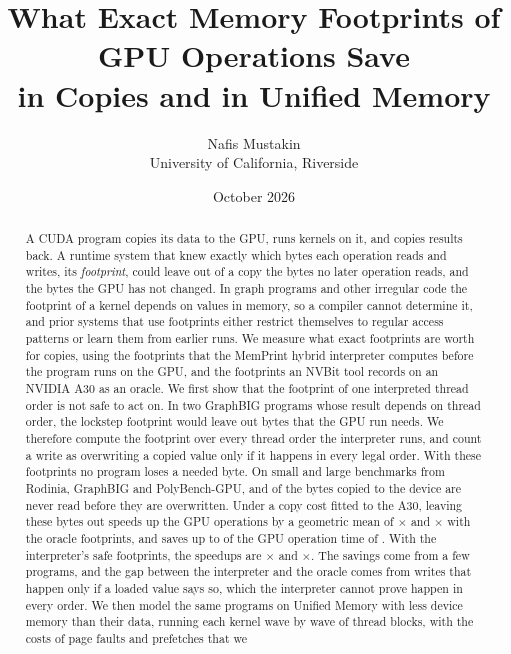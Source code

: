 \documentclass[11pt]{article}
\title{What Exact Memory Footprints of GPU Operations Save\\in Copies and in Unified Memory}
\author{Nafis Mustakin\\University of California, Riverside}
\date{October 2026}
\newcommand{\memprint}{MemPrint}
\newcommand{\term}[1]{\emph{#1}}
\newcommand{\code}[1]{\texttt{#1}}
\begin{document}
\maketitle



\begin{abstract}
A CUDA program copies its data to the GPU, runs kernels on it, and copies results back. A runtime system that
knew exactly which bytes each operation reads and writes, its \term{footprint}, could leave out of a copy the bytes
no later operation reads, and the bytes the GPU has not changed. In graph programs and other irregular code the
footprint of a kernel depends on values in memory, so a compiler cannot determine it, and prior systems that use
footprints either restrict themselves to regular access patterns or learn them from earlier runs. We measure what
exact footprints are worth for copies, using the footprints that the \memprint{} hybrid interpreter computes before
the program runs on the GPU, and the footprints an NVBit tool records on an NVIDIA A30 as an oracle. We first show
that the footprint of one interpreted thread order is not safe to act on. In two GraphBIG programs whose result
depends on thread order, the lockstep footprint would leave out bytes that the GPU run needs. We therefore compute
the footprint over every thread order the interpreter runs, and count a write as overwriting a copied value only if
it happens in every legal order. With these footprints no program loses a needed byte. On \numSmallPrograms{} small
and \numLargePrograms{} large benchmarks from Rodinia, GraphBIG and PolyBench-GPU, \numSmallTrHtoDUnneeded{} and
\numLargeTrHtoDUnneeded{} of the bytes copied to the device are never read before they are overwritten. Under a copy
cost fitted to the A30, leaving these bytes out speeds up the GPU operations by a geometric mean of
\numSmallTrGeo{}$\times$ and \numLargeTrGeo{}$\times$ with the oracle footprints, and saves up to \numLargeTrMax{}
of the GPU operation time of \code{\numLargeTrMaxName{}}. With the interpreter's safe footprints, the speedups are
\numSmallHyGeo{}$\times$ and \numLargeHyGeo{}$\times$. The savings come from a few programs, and the gap between
the interpreter and the oracle comes from writes that happen only if a loaded value says so, which the interpreter
cannot prove happen in every order. We then model the same programs on Unified Memory with less device memory than
their data, running each kernel wave by wave of thread blocks, with the costs of page faults and prefetches that we

\end{abstract}
\end{document}

